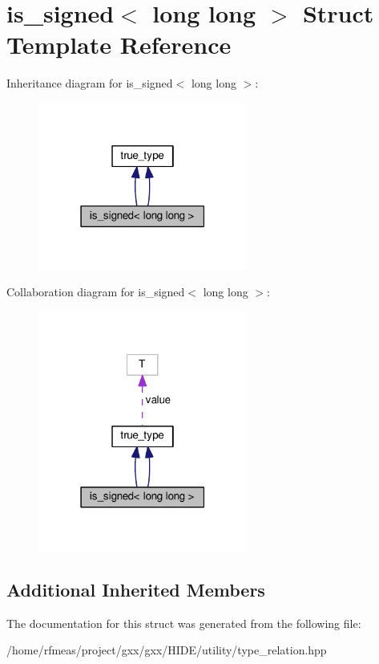 \hypertarget{structis__signed_3_01long_01long_01_4}{}\section{is\+\_\+signed$<$ long long $>$ Struct Template Reference}
\label{structis__signed_3_01long_01long_01_4}


Inheritance diagram for is\+\_\+signed$<$ long long $>$\+:
\nopagebreak
\begin{figure}[H]
\begin{center}
\leavevmode
\includegraphics[width=195pt]{structis__signed_3_01long_01long_01_4__inherit__graph}
\end{center}
\end{figure}


Collaboration diagram for is\+\_\+signed$<$ long long $>$\+:
\nopagebreak
\begin{figure}[H]
\begin{center}
\leavevmode
\includegraphics[width=195pt]{structis__signed_3_01long_01long_01_4__coll__graph}
\end{center}
\end{figure}
\subsection*{Additional Inherited Members}


The documentation for this struct was generated from the following file\+:\begin{DoxyCompactItemize}
\item 
/home/rfmeas/project/gxx/gxx/\+H\+I\+D\+E/utility/type\+\_\+relation.\+hpp\end{DoxyCompactItemize}
